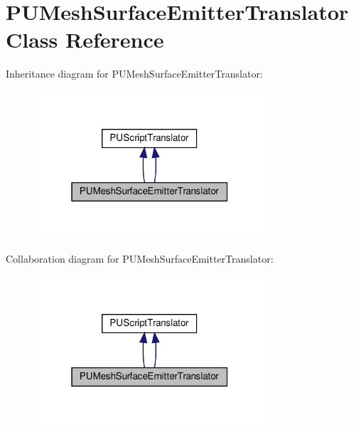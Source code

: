 \hypertarget{classPUMeshSurfaceEmitterTranslator}{}\section{P\+U\+Mesh\+Surface\+Emitter\+Translator Class Reference}
\label{classPUMeshSurfaceEmitterTranslator}


Inheritance diagram for P\+U\+Mesh\+Surface\+Emitter\+Translator\+:
\nopagebreak
\begin{figure}[H]
\begin{center}
\leavevmode
\includegraphics[width=244pt]{classPUMeshSurfaceEmitterTranslator__inherit__graph}
\end{center}
\end{figure}


Collaboration diagram for P\+U\+Mesh\+Surface\+Emitter\+Translator\+:
\nopagebreak
\begin{figure}[H]
\begin{center}
\leavevmode
\includegraphics[width=244pt]{classPUMeshSurfaceEmitterTranslator__coll__graph}
\end{center}
\end{figure}
